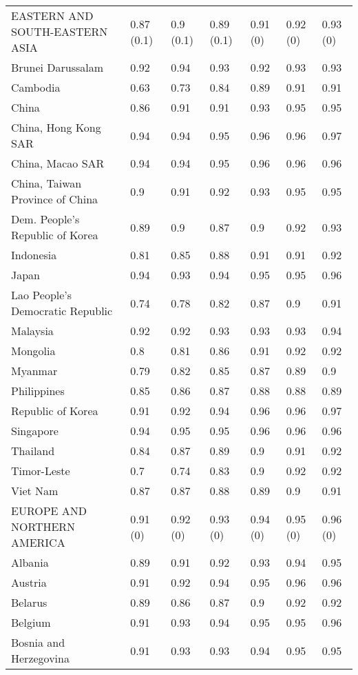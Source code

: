 \begin{longtable}[t]{lllllll}
EASTERN AND SOUTH-EASTERN ASIA & 0.87 (0.1) & 0.9 (0.1) & 0.89 (0.1) & 0.91 (0) & 0.92 (0) & 0.93 (0)\\
Brunei Darussalam & 0.92 & 0.94 & 0.93 & 0.92 & 0.93 & 0.93\\
Cambodia & 0.63 & 0.73 & 0.84 & 0.89 & 0.91 & 0.91\\
China & 0.86 & 0.91 & 0.91 & 0.93 & 0.95 & 0.95\\
China, Hong Kong SAR & 0.94 & 0.94 & 0.95 & 0.96 & 0.96 & 0.97\\
China, Macao SAR & 0.94 & 0.94 & 0.95 & 0.96 & 0.96 & 0.96\\
China, Taiwan Province of China & 0.9 & 0.91 & 0.92 & 0.93 & 0.95 & 0.95\\
Dem. People's Republic of Korea & 0.89 & 0.9 & 0.87 & 0.9 & 0.92 & 0.93\\
Indonesia & 0.81 & 0.85 & 0.88 & 0.91 & 0.91 & 0.92\\
Japan & 0.94 & 0.93 & 0.94 & 0.95 & 0.95 & 0.96\\
Lao People's Democratic Republic & 0.74 & 0.78 & 0.82 & 0.87 & 0.9 & 0.91\\
Malaysia & 0.92 & 0.92 & 0.93 & 0.93 & 0.93 & 0.94\\
Mongolia & 0.8 & 0.81 & 0.86 & 0.91 & 0.92 & 0.92\\
Myanmar & 0.79 & 0.82 & 0.85 & 0.87 & 0.89 & 0.9\\
Philippines & 0.85 & 0.86 & 0.87 & 0.88 & 0.88 & 0.89\\
Republic of Korea & 0.91 & 0.92 & 0.94 & 0.96 & 0.96 & 0.97\\
Singapore & 0.94 & 0.95 & 0.95 & 0.96 & 0.96 & 0.96\\
Thailand & 0.84 & 0.87 & 0.89 & 0.9 & 0.91 & 0.92\\
Timor-Leste & 0.7 & 0.74 & 0.83 & 0.9 & 0.92 & 0.92\\
Viet Nam & 0.87 & 0.87 & 0.88 & 0.89 & 0.9 & 0.91\\
EUROPE AND NORTHERN AMERICA & 0.91 (0) & 0.92 (0) & 0.93 (0) & 0.94 (0) & 0.95 (0) & 0.96 (0)\\
Albania & 0.89 & 0.91 & 0.92 & 0.93 & 0.94 & 0.95\\
Austria & 0.91 & 0.92 & 0.94 & 0.95 & 0.96 & 0.96\\
Belarus & 0.89 & 0.86 & 0.87 & 0.9 & 0.92 & 0.92\\
Belgium & 0.91 & 0.93 & 0.94 & 0.95 & 0.95 & 0.96\\
Bosnia and Herzegovina & 0.91 & 0.93 & 0.93 & 0.94 & 0.95 & 0.95\\

\end{longtable}
